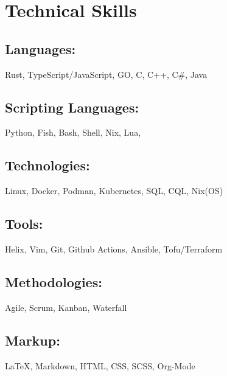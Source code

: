 \section{Technical Skills}

\subsection{Languages:} Rust, TypeScript/JavaScript, GO, C, C++, C\#, Java
\subsection{Scripting Languages:} Python, Fish, Bash, Shell, Nix, Lua, 
\subsection{Technologies:} Linux, Docker, Podman, Kubernetes, SQL, CQL, Nix(OS)
\subsection{Tools:} Helix, Vim, Git, Github Actions, Ansible, Tofu/Terraform
\subsection{Methodologies:} Agile, Scrum, Kanban, Waterfall
\subsection{Markup:} {\LaTeX}, Markdown, HTML, CSS, SCSS, Org-Mode
